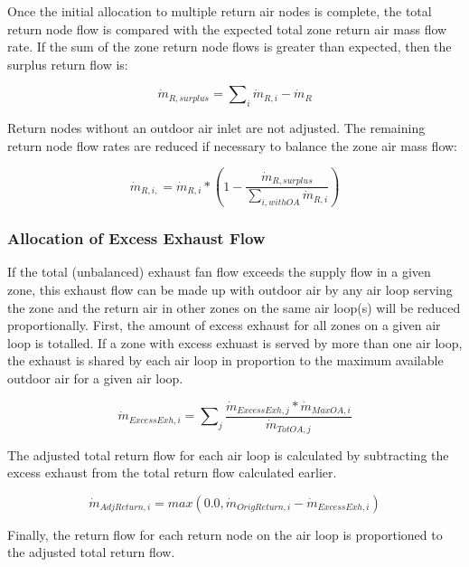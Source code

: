 Once the initial allocation to multiple return air nodes is complete, the total return node flow is compared with the expected total zone return air mass flow rate. If the sum of the zone return node flows is greater than expected, then the surplus return flow is:

\begin{equation}
{\dot m_{R,surplus}} = \sum\nolimits_i {{{\dot m}_{R,i}}} - {\dot m_{R}}
\end{equation}

Return nodes without an outdoor air inlet are not adjusted. The remaining return node flow rates are reduced if necessary to balance the zone air mass flow:

\begin{equation}
{\dot m_{R,i,}} = {\dot m_{R,i}} * \left( 1 - \frac{\dot m_{R,surplus}} {\sum\nolimits_{i,withOA} {{{\dot m}_{R,i}}}} \right) 
\end{equation}

\subsubsection{Allocation of Excess Exhaust Flow}\label{allocation-of-excess-exhaust-flow}

If the total (unbalanced) exhaust fan flow exceeds the supply flow in a given zone, this exhaust flow can be made up with outdoor air by any air loop serving the zone and the return air in other zones on the same air loop(s) will be reduced proportionally. First, the amount of excess exhaust for all zones on a given air loop is totalled.  If a zone with excess exhuast is served by more than one air loop, the exhaust is shared by each air loop in proportion to the maximum available outdoor air for a given air loop.

\begin{equation}
{\dot m_{ExcessExh,i}} = {\sum\nolimits_{j} {\frac{\dot m_{ExcessExh,j} * \dot m_{MaxOA,i}} {\dot m_{TotOA,j}} }}
\end{equation}

The adjusted total return flow for each air loop is calculated by subtracting the excess exhaust from the total return flow calculated earlier.

\begin{equation}
\dot{m}_{AdjReturn,i} = max\left( 0.0, \dot{m}_{OrigReturn,i} - \dot{m}_{ExcessExh,i} \right)
\end{equation}

Finally, the return flow for each return node on the air loop is proportioned to the adjusted total return flow.

